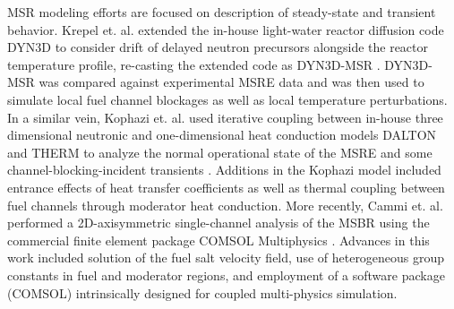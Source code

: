 \documentclass{article}
\begin{document}
\gls{MSR} modeling efforts are focused on description of steady-state and
transient behavior. Krepel et. al. extended the in-house light-water reactor
diffusion code DYN3D to consider drift of delayed neutron precursors alongside
the reactor temperature profile, re-casting the extended code as
DYN3D-MSR \cite{krepel_dyn3d-msr_2007}. DYN3D-MSR was compared against
experimental \gls{MSRE} data and was then used to simulate local fuel channel
blockages as well as local temperature perturbations. In a similar vein, Kophazi
et. al. used iterative coupling between in-house three dimensional neutronic and
one-dimensional heat conduction models DALTON and THERM to analyze the normal
operational state of the \gls{MSRE} and some channel-blocking-incident
transients \cite{kophazi_development_2009}. Additions in the Kophazi model
included entrance effects of heat transfer coefficients as well as thermal
coupling between fuel channels through moderator heat conduction. More recently,
Cammi et. al. performed a 2D-axisymmetric single-channel analysis of the
\gls{MSBR} using the commercial finite element package COMSOL
Multiphysics \cite{cammi_multi-physics_2011}. Advances in this work included
solution of the fuel salt velocity field, use of heterogeneous group constants
in fuel and moderator regions, and employment of a software package (COMSOL)
intrinsically designed for coupled multi-physics simulation.
\end{document}
